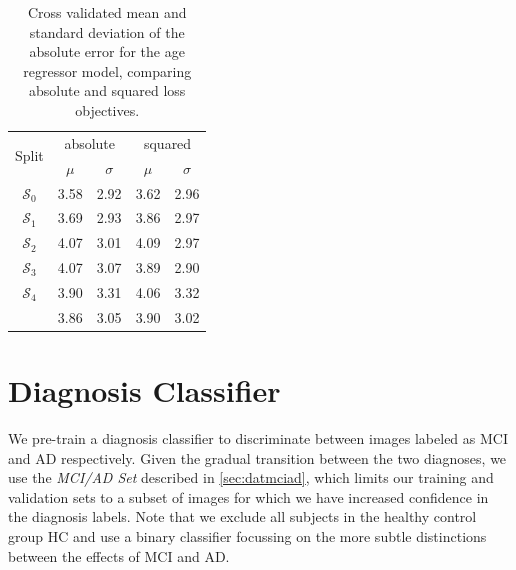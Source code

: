 \begin{table}[h]
	\begin{center}
		\begin{tabular}{c c c c c}
			\toprule
			\multirow{2}{*}{Split} & 
			\multicolumn{2}{c}{absolute} & 
			\multicolumn{2}{c}{squared} \\
			\cmidrule(lr){2-3}
			\cmidrule(lr){4-5}
			 & $\mu$ & $\sigma$ & $\mu$ & $\sigma$ \\ 
			\cmidrule(lr){1-5}
			$\mathcal{S}_0$ & 3.58 & 2.92 & 3.62 & 2.96 \\
			$\mathcal{S}_1$ & 3.69 & 2.93 & 3.86 & 2.97 \\
			$\mathcal{S}_2$ & 4.07 & 3.01 & 4.09 & 2.97 \\
			$\mathcal{S}_3$ & 4.07 & 3.07 & 3.89 & 2.90 \\
			$\mathcal{S}_4$ & 3.90 & 3.31 & 4.06 & 3.32 \\
			\cmidrule(lr){1-5}
			                & 3.86 & 3.05 & 3.90 & 3.02 \\
			\bottomrule
		\end{tabular}
		\caption{Cross validated mean and standard deviation of the absolute error for the age regressor model, comparing absolute and squared loss objectives.}
		\label{tab:regcrossval}
	\end{center}
\end{table}

\section{Diagnosis Classifier}
\label{sec:expdxclf}
We pre-train a diagnosis classifier to discriminate between images labeled as MCI and AD respectively. Given the gradual transition between the two diagnoses, we use the \textit{MCI/AD Set} described in \autoref{sec:datmciad}, which limits our training and validation sets to a subset of images for which we have increased confidence in the diagnosis labels. Note that we exclude all subjects in the healthy control group HC and use a binary classifier focussing on the more subtle distinctions between the effects of MCI and AD.

